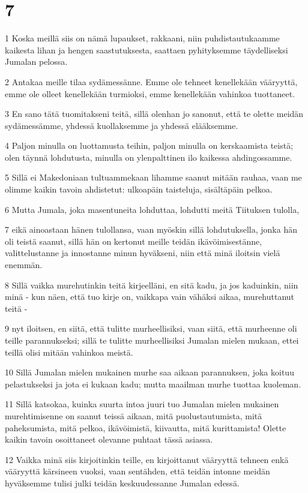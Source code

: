 \chapter{7}

\par 1 Koska meillä siis on nämä lupaukset, rakkaani, niin puhdistautukaamme kaikesta lihan ja hengen saastutuksesta, saattaen pyhityksemme täydelliseksi Jumalan pelossa.
\par 2 Antakaa meille tilaa sydämessänne. Emme ole tehneet kenellekään vääryyttä, emme ole olleet kenellekään turmioksi, emme kenellekään vahinkoa tuottaneet.
\par 3 En sano tätä tuomitakseni teitä, sillä olenhan jo sanonut, että te olette meidän sydämessämme, yhdessä kuollaksemme ja yhdessä elääksemme.
\par 4 Paljon minulla on luottamusta teihin, paljon minulla on kerskaamista teistä; olen täynnä lohdutusta, minulla on ylenpalttinen ilo kaikessa ahdingossamme.
\par 5 Sillä ei Makedoniaan tultuammekaan lihamme saanut mitään rauhaa, vaan me olimme kaikin tavoin ahdistetut: ulkoapäin taisteluja, sisältäpäin pelkoa.
\par 6 Mutta Jumala, joka masentuneita lohduttaa, lohdutti meitä Tiituksen tulolla,
\par 7 eikä ainoastaan hänen tulollansa, vaan myöskin sillä lohdutuksella, jonka hän oli teistä saanut, sillä hän on kertonut meille teidän ikävöimisestänne, valittelustanne ja innostanne minun hyväkseni, niin että minä iloitsin vielä enemmän.
\par 8 Sillä vaikka murehutinkin teitä kirjeelläni, en sitä kadu, ja jos kaduinkin, niin minä - kun näen, että tuo kirje on, vaikkapa vain vähäksi aikaa, murehuttanut teitä -
\par 9 nyt iloitsen, en siitä, että tulitte murheellisiksi, vaan siitä, että murheenne oli teille parannukseksi; sillä te tulitte murheellisiksi Jumalan mielen mukaan, ettei teillä olisi mitään vahinkoa meistä.
\par 10 Sillä Jumalan mielen mukainen murhe saa aikaan parannuksen, joka koituu pelastukseksi ja jota ei kukaan kadu; mutta maailman murhe tuottaa kuoleman.
\par 11 Sillä katsokaa, kuinka suurta intoa juuri tuo Jumalan mielen mukainen murehtimisenne on saanut teissä aikaan, mitä puolustautumista, mitä paheksumista, mitä pelkoa, ikävöimistä, kiivautta, mitä kurittamista! Olette kaikin tavoin osoittaneet olevanne puhtaat tässä asiassa.
\par 12 Vaikka minä siis kirjoitinkin teille, en kirjoittanut vääryyttä tehneen enkä vääryyttä kärsineen vuoksi, vaan sentähden, että teidän intonne meidän hyväksemme tulisi julki teidän keskuudessanne Jumalan edessä.

